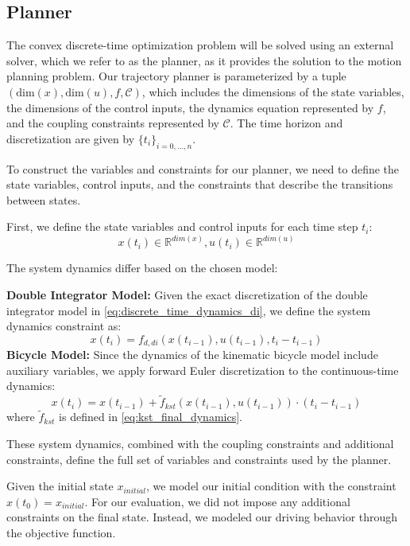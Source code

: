 \subsection{Planner}

The convex discrete-time optimization problem will be solved using an external solver, which we refer to as the planner, as it provides the solution
to the motion planning problem.
Our trajectory planner is parameterized by a tuple $(\text{dim}(x), \text{dim}(u), f, \mathcal{C})$, which includes the dimensions of the state
variables, the dimensions of the control inputs, the dynamics equation represented by $f$, and the coupling constraints represented by $\mathcal{C}$.
The time horizon and discretization are given by $\{t_i\}_{i=0,\dots,n}$.

To construct the variables and constraints for our planner, we need to define the state variables, control inputs, and the constraints that describe
the transitions between states.

First, we define the state variables and control inputs for each time step $t_i$:
\begin{equation}
	x(t_i) \in \mathbb{R}^{dim(x)}, u(t_i) \in \mathbb{R}^{dim(u)}
\end{equation}

The system dynamics differ based on the chosen model:

\textbf{Double Integrator Model:} Given the exact discretization of the double integrator
model in \eqref{eq:discrete_time_dynamics_di}, we define the system dynamics constraint as:
\begin{equation}
	x(t_i) = f_{d,di}(x(t_{i-1}), u(t_{i-1}), t_i - t_{i-1})
\end{equation}
\textbf{Bicycle Model:}
Since the dynamics of the kinematic bicycle model include auxiliary variables, we apply forward Euler discretization to the continuous-time dynamics:
\begin{equation}
	x(t_i) = x(t_{i-1}) + \tilde{f}_{kst}(x(t_{i-1}), u(t_{i-1})) \cdot (t_i - t_{i-1})
\end{equation}
where $\tilde{f}_{kst}$ is defined in \eqref{eq:kst_final_dynamics}.

These system dynamics, combined with the coupling constraints and additional constraints, define the full set of variables and constraints used by
the planner.

Given the initial state $x_{initial}$, we model our initial condition with the constraint $x(t_0) = x_{initial}$.
For our evaluation, we did not impose any additional constraints on the final state.
Instead, we modeled our driving behavior through the objective function.

